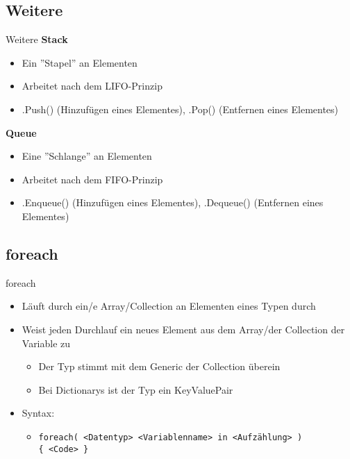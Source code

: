 \subsection{Weitere}
\begin{frame}{Weitere}
	\textbf{Stack}\\
	\begin{itemize}
		\item Ein ''Stapel'' an Elementen
		\item Arbeitet nach dem LIFO-Prinzip
		\item \alert{.Push()} (Hinzufügen eines Elementes), \alert{.Pop()} (Entfernen eines Elementes)
	\end{itemize}
	
	\textbf{Queue}\\
	\begin{itemize}
		\item Eine ''Schlange'' an Elementen
		\item Arbeitet nach dem FIFO-Prinzip
		\item \alert{.Enqueue()} (Hinzufügen eines Elementes), \alert{.Dequeue()} (Entfernen eines Elementes)
	\end{itemize}
	
\end{frame}

\subsection{foreach}
\begin{frame}{foreach}
	\begin{itemize}
		\item Läuft durch ein/e Array/Collection an Elementen eines Typen durch 
		\item Weist jeden Durchlauf ein neues Element aus dem Array/der Collection der Variable zu
		\begin{itemize}
			\item Der Typ stimmt mit dem Generic der Collection überein
			\item Bei Dictionarys ist der Typ ein \alert{KeyValuePair}		
		\end{itemize}
		\item Syntax:
		\begin{itemize}
			\item \texttt{foreach( \alert{<Datentyp> <Variablenname>} in \alert{<Aufzählung>} )\\ \{ \alert{<Code>} \}}
		\end{itemize}
	\end{itemize}
		
\end{frame}


